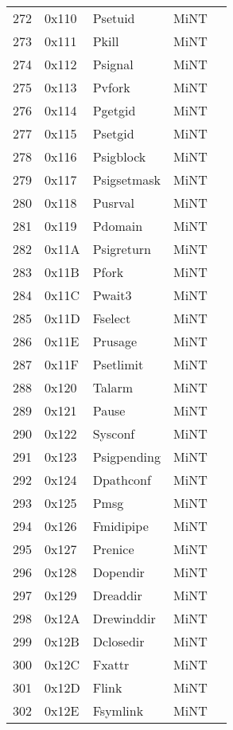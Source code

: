 \documentclass[a4paper]{article}
\begin{document}
\begin{supertabular}{|p{0.6cm}|p{1cm}|p{2cm}|p{1cm}|p{10cm}|}
272     & 0x110 & Psetuid     & MiNT  &  \\
273     & 0x111 & Pkill       & MiNT  &  \\
274     & 0x112 & Psignal     & MiNT  &  \\
275     & 0x113 & Pvfork      & MiNT  &  \\
276     & 0x114 & Pgetgid     & MiNT  &  \\
277     & 0x115 & Psetgid     & MiNT  &  \\
278     & 0x116 & Psigblock   & MiNT  &  \\
279     & 0x117 & Psigsetmask & MiNT  &  \\
280     & 0x118 & Pusrval     & MiNT  &  \\
281     & 0x119 & Pdomain     & MiNT  &  \\
282     & 0x11A & Psigreturn  & MiNT  &  \\
283     & 0x11B & Pfork       & MiNT  &  \\
284     & 0x11C & Pwait3      & MiNT  &  \\
285     & 0x11D & Fselect     & MiNT  &  \\
286     & 0x11E & Prusage     & MiNT  &  \\
287     & 0x11F & Psetlimit   & MiNT  &  \\
288     & 0x120 & Talarm      & MiNT  &  \\
289     & 0x121 & Pause       & MiNT  &  \\
290     & 0x122 & Sysconf     & MiNT  &  \\
291     & 0x123 & Psigpending & MiNT  &  \\
292     & 0x124 & Dpathconf   & MiNT  &  \\
293     & 0x125 & Pmsg        & MiNT  &  \\
294     & 0x126 & Fmidipipe   & MiNT  &  \\
295     & 0x127 & Prenice     & MiNT  &  \\
296     & 0x128 & Dopendir    & MiNT  &  \\
297     & 0x129 & Dreaddir    & MiNT  &  \\
298     & 0x12A & Drewinddir  & MiNT  &  \\
299     & 0x12B & Dclosedir   & MiNT  &  \\
300     & 0x12C & Fxattr      & MiNT  &  \\
301     & 0x12D & Flink       & MiNT  &  \\
302     & 0x12E & Fsymlink    & MiNT  &  \\

\end{supertabular}
\end{document}
